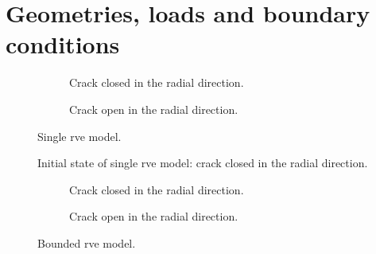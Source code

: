 \documentclass[a4paper, twoside,12pt, abstract]{scrartcl} %
\begin{document}
\clearscrheadings
\pagestyle{scrheadings}
\manualmark
\ofoot{\\\pagemark} %
\ifoot{} %
\setheadtopline{2pt}
\setheadsepline{0.5pt}
\setfootsepline{0.5pt}

\section{Geometries, loads and boundary conditions}



\begin{figure}
\centering
    \begin{subfigure}[b]{0.45\textwidth}
        \caption{Crack closed in the radial direction.}
        \label{fig:singleRVE_cc}
    \end{subfigure}
\quad
 \begin{subfigure}[b]{0.45\textwidth}
        
        \caption{Crack open in the radial direction.}
        \label{fig:singleRVE_oc}
    \end{subfigure}
  \caption{Single \acrshort{rve} model.}
  \label{fig:singleRVE_ccoc}
\end{figure}

\begin{figure}[!h]
\centering
  \caption{Initial state of single \acrshort{rve} model: crack closed in the radial direction.}
  \label{fig:singleRVE_onlycc}
\end{figure}

\begin{figure}
\centering
    \begin{subfigure}[b]{0.45\textwidth}
        \caption{Crack closed in the radial direction.}
        \label{fig:boundedRVE_cc}
    \end{subfigure}
\quad
 \begin{subfigure}[b]{0.45\textwidth}
        
        \caption{Crack open in the radial direction.}
        \label{fig:boundedRVE_oc}
    \end{subfigure}
  \caption{Bounded \acrshort{rve} model.}
  \label{fig:boundedRVE_ccoc}
\end{figure}
\end{document}
